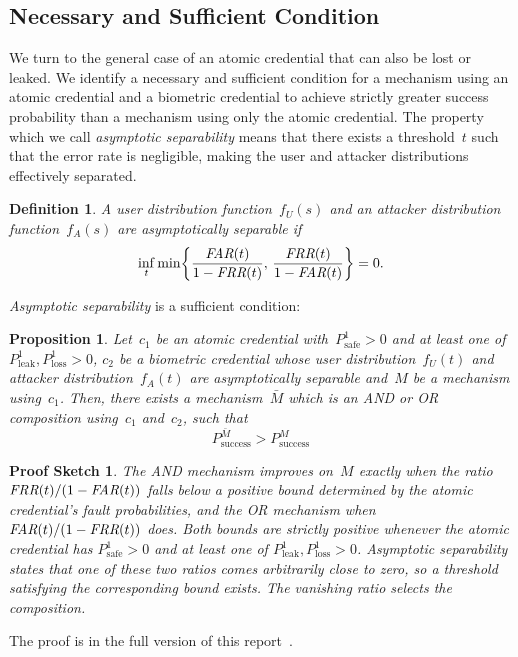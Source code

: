 \documentclass[conference,compsoc]{IEEEtran}
\newtheorem{proposition}{Proposition}
\newtheorem*{proofsketch}{Proof Sketch}
\newtheorem{definition}{Definition}
\begin{document}
\subsection{Necessary and Sufficient Condition}\label{sec:necessary_sufficient_success_condition}
\noindent 
We turn to the general case of an atomic credential that can also be lost or leaked. We identify a necessary and sufficient condition for a mechanism using an atomic credential and a biometric credential to achieve strictly greater success probability than a mechanism using only the atomic credential.
The property which we call \emph{asymptotic separability} means that there exists a threshold~$t$ such that the error rate is negligible, making the user and attacker distributions effectively separated.
\begin{definition}
A user distribution function~$f_U(s)$ and an attacker distribution function~$f_A(s)$ are \emph{asymptotically separable} if
\begin{equation*}
    \inf_{t}
    \min\!\left\{
    \frac{\textit{FAR}(t)}{1-\textit{FRR}(t)},\,
    \frac{\textit{FRR}(t)}{1-\textit{FAR}(t)}
    \right\}
    = 0.
\end{equation*}
\end{definition}
\emph{Asymptotic separability} is a sufficient condition:
\begin{proposition}\label{thm:suf_nec_cond_for_improve}
    Let~$c_1$ be an atomic credential with~$P^1_\text{safe} > 0$ and at least one of~$P^1_\text{leak},P^1_\text{loss} > 0$, $c_2$ be a biometric credential whose user distribution~$f_U(t)$ and attacker distribution~$f_A(t)$ are asymptotically separable and~$M$ be a mechanism using~$c_1$. Then, there exists a mechanism~$\bar{M}$ which is an \emph{AND} or \emph{OR} composition using~$c_1$ and~$c_2$, such that
    \begin{equation*}
        P_{\mathrm{success}}^{\bar{M}} > P_{\mathrm{success}}^{M}
    \end{equation*}
\end{proposition}
\noindent
\begin{proofsketch}
The \emph{AND} mechanism improves on~$M$ exactly when the ratio~$\textit{FRR}(t)/(1-\textit{FAR}(t))$ falls below a positive bound determined by the atomic credential’s fault probabilities, and the \emph{OR} mechanism when~$\textit{FAR}(t)/(1-\textit{FRR}(t))$ does.
Both bounds are strictly positive whenever the atomic credential has $P^1_\text{safe} > 0$ and at least one of $P^1_\text{leak}, P^1_\text{loss} > 0$.
Asymptotic separability states that one of these two ratios comes arbitrarily close to zero, so a threshold satisfying the corresponding bound exists. The vanishing ratio selects the composition.
\end{proofsketch}
\noindent
The proof is in the full version of this report~\cite{biometric_full_version}.
\end{document}
